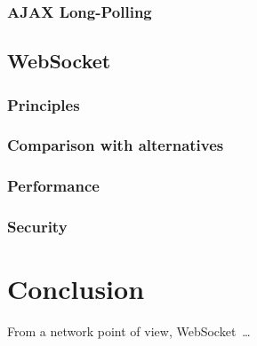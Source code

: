 \documentclass[journal,compsoc]{IEEEtran}
\newcommand{\ws}{WebSocket~}
\begin{document}
\subsubsection{AJAX Long-Polling}


\subsection{\ws}

\subsubsection{Principles}

\subsubsection{Comparison with alternatives}

\subsubsection{Performance}

\subsubsection{Security}



\section{Conclusion}

From a network point of view, \ws …


\ifCLASSOPTIONcaptionsoff
  \newpage
\fi




\end{document}
